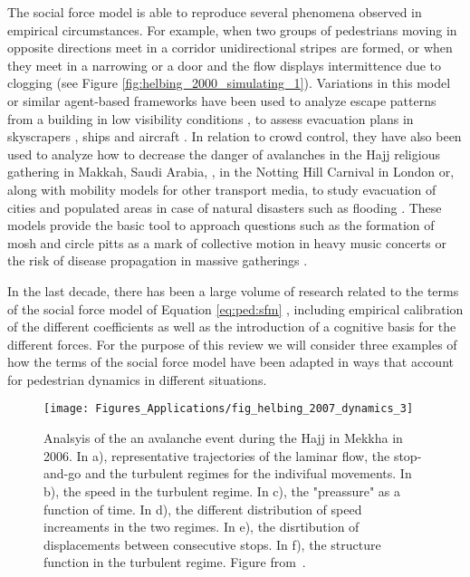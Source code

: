 The social force model is able to reproduce several phenomena observed in empirical circumstances. For example, when two groups of pedestrians moving in opposite directions meet in a corridor unidirectional stripes are formed, or when they meet in a narrowing or a door and the flow displays intermittence due to clogging \cite{helbing_2001_self} (see Figure \ref{fig:helbing_2000_simulating_1}). Variations in this model or similar agent-based  frameworks have been used to analyze escape patterns from a building in low visibility conditions \cite{helbing_2000_simulating, helbing_2013_pedestrian}, to assess evacuation plans in skyscrapers \cite{sikora_2012_model,parisi_2014_sequential}, ships \cite{chen_2015_modeling} and aircraft \cite{kirchner_2003_friction}. In relation to crowd control, they have also been used to analyze how to decrease the danger of avalanches in the Hajj religious gathering in Makkah, Saudi Arabia, \cite{helbing_2007_dynamics,johansson_2008_crowd}, in the Notting Hill Carnival in London \cite{batty_2003_safety} or, along with mobility models for other transport media, to study evacuation of cities and populated areas in case of natural disasters such as flooding \cite{lammel_2010_representation,kunwar_2014_large,kunwar_2015_evacuation}. These models provide the basic tool to approach questions such as the formation of mosh and circle pitts as a mark of collective motion in heavy music concerts \cite{silverberg_2013_collective} or the risk of disease propagation in massive gatherings \cite{johansson_2012_crowd}.  

In the last decade, there has been a large volume of research related to the terms of the social force model of Equation \ref{eq:ped:sfm} \cite{zainuddin_2010_characteristics}, including empirical calibration of the different coefficients \cite{johansson_2008_crowd} as well as the introduction of a cognitive basis for the different forces. For the purpose of this review we will consider three examples of how the terms of the social force model have been adapted in ways that account for pedestrian dynamics in different situations. 


\begin{figure}
\centering
\texttt{[image: Figures\_Applications/fig\_helbing\_2007\_dynamics\_3]}
\caption{Analsyis of the an avalanche event during the Hajj in Mekkha in 2006. In a), representative trajectories of the laminar flow, the stop-and-go and the turbulent regimes for the indivifual movements. In b), the speed in the turbulent regime. In c), the "preassure" as a function of time. In d), the different distribution of speed increaments in the two regimes. In e), the disrtibution of displacements between consecutive stops. In f), the structure function in the turbulent regime. Figure from~\cite{helbing_2007_dynamics}. \label{fig:helbing_2007_dynamics_3}}
\end{figure}


